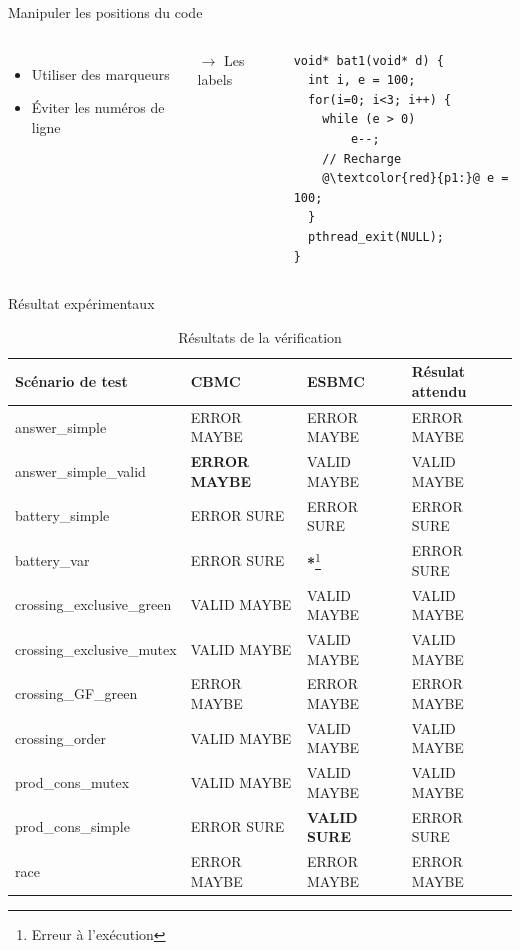 \documentclass{beamer}
\begin{document}
\begin{frame}[fragile]{Manipuler les positions du code}
\begin{columns}[onlytextwidth, c]
  \begin{itemize}
    \setlength{\itemsep}{1.5em}
    \item Utiliser des marqueurs
    \item \alert{Éviter les numéros de ligne}
  \end{itemize}

  \vspace{5em}
  $\rightarrow$ Les labels

\begin{lstlisting}
void* bat1(void* d) {
  int i, e = 100;
  for(i=0; i<3; i++) {
    while (e > 0)
        e--;
    // Recharge
    @\textcolor{red}{p1:}@ e = 100;
  }
  pthread_exit(NULL);
}
\end{lstlisting}
\end{columns}
\end{frame}

\begin{frame}{Résultat expérimentaux}
\begin{table}[tbp]
  \scriptsize
  \centering
\label{tbl:resultats}
\caption{Résultats de la vérification}
\begin{tabular}{|l|l|l|l|}
\hline
Scénario de test           & CBMC                 & ESBMC            & Résulat attendu \\
\hline
answer\_simple             & ERROR MAYBE          & ERROR MAYBE      & ERROR MAYBE     \\
answer\_simple\_valid      & \textbf{ERROR MAYBE} & VALID MAYBE      & VALID MAYBE     \\
battery\_simple            & ERROR SURE           & ERROR SURE       & ERROR SURE      \\
battery\_var               & ERROR SURE           & \textbf{*}\footnote{Erreur à l'exécution}& ERROR SURE      \\
crossing\_exclusive\_green & VALID MAYBE          & VALID MAYBE      & VALID MAYBE     \\
crossing\_exclusive\_mutex & VALID MAYBE          & VALID MAYBE      & VALID MAYBE     \\
crossing\_GF\_green        & ERROR MAYBE          & ERROR MAYBE      & ERROR MAYBE     \\
crossing\_order            & VALID MAYBE          & VALID MAYBE      & VALID MAYBE     \\
prod\_cons\_mutex          & VALID MAYBE          & VALID MAYBE      & VALID MAYBE     \\
prod\_cons\_simple         & ERROR SURE           & \textbf{VALID SURE} & ERROR SURE      \\
race                       & ERROR MAYBE          & ERROR MAYBE      & ERROR MAYBE     \\
\hline
\end{tabular}
\end{table}
\end{frame}
\end{document}
